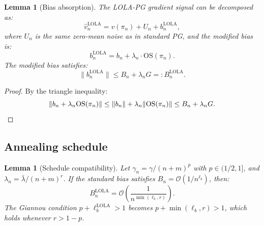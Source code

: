 \documentclass[11pt,a4paper]{article}
\newtheorem{lemma}[theorem]{Lemma}
\begin{document}
\begin{lemma}[Bias absorption]
\label{lem:bias-absorption}
The LOLA-PG gradient signal can be decomposed as:
\begin{equation}
    \hat{v}_n^{\mathrm{LOLA}} = v(\pi_n) + U_n + b_n^{\mathrm{LOLA}},
\end{equation}
where $U_n$ is the same zero-mean noise as in standard PG, and the modified bias is:
\begin{equation}
\label{eq:bias-lola}
    b_n^{\mathrm{LOLA}} = b_n + \lambda_n \cdot \mathrm{OS}(\pi_n).
\end{equation}
The modified bias satisfies:
\begin{equation}
\label{eq:bias-bound-lola}
    \|b_n^{\mathrm{LOLA}}\| \leq B_n + \lambda_n G =: B_n^{\mathrm{LOLA}}.
\end{equation}
\end{lemma}

\begin{proof}
By the triangle inequality:
\[
    \|b_n + \lambda_n \mathrm{OS}(\pi_n)\| \leq \|b_n\| + \lambda_n \|\mathrm{OS}(\pi_n)\| \leq B_n + \lambda_n G. \qedhere
\]
\end{proof}

\subsection{Annealing schedule}

\begin{lemma}[Schedule compatibility]
\label{lem:schedule}
Let $\gamma_n = \gamma/(n+m)^p$ with $p \in (1/2, 1]$, and $\lambda_n = \bar{\lambda}/(n+m)^r$. If the standard bias satisfies $B_n = \mathcal{O}(1/n^{\ell_b})$, then:
\begin{equation}
    B_n^{\mathrm{LOLA}} = \mathcal{O}\!\left(\frac{1}{n^{\min(\ell_b, r)}}\right).
\end{equation}
The Giannou condition $p + \ell_b^{\mathrm{LOLA}} > 1$ becomes $p + \min(\ell_b, r) > 1$, which holds whenever $r > 1 - p$.
\end{lemma}
\end{document}
